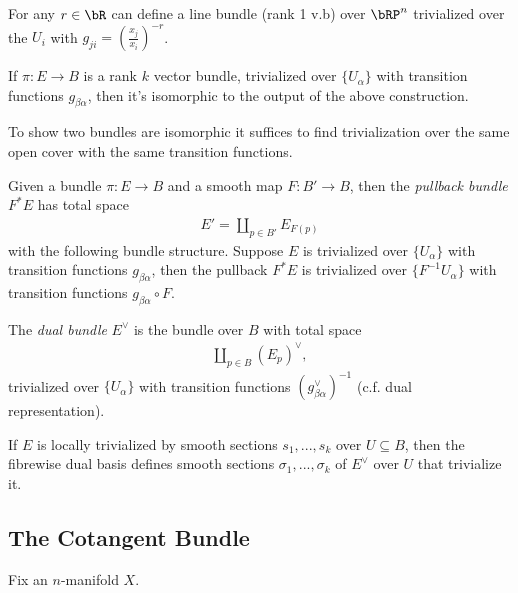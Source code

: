 \begin{example}\label{example:lec2.18}
	For any $r \in \bR$ can define a line bundle (rank 1 v.b) over $\bRP^n$ trivialized over the $U_i$ with $g_{ji} = \left(\frac{x_j}{x_i}\right)^{-r}$.
\end{example}
\begin{lem}\label{lem:lec2.19}
	If $\pi :E\to B$ is a rank $k$ vector bundle, trivialized over $\{U_\alpha\}$ with transition functions $g_{\beta\alpha}$, then it's isomorphic to the output of the above construction.
\end{lem}

\begin{cor}\label{cor:lec2.20}
	To show two bundles are isomorphic it suffices to find trivialization over the same open cover with the same transition functions.
\end{cor}

\begin{defn}\label{defn:pullback-bundle}
	Given a bundle $\pi:E\to B$ and a smooth map $F:B'\to B$, then the \emph{pullback bundle} $F^*E$ has total space
	\begin{align*}
		E' = \coprod_{p \in B'} E_{F(p)}
	\end{align*}
	with the following bundle structure. Suppose $E$ is trivialized over $\{U_\alpha\}$ with transition functions $g_{\beta\alpha}$, then the pullback $F^*E$ is trivialized over $\{F^{-1}U_\alpha\}$ with transition functions $g_{\beta\alpha} \circ F$.
\end{defn}

\begin{defn}\label{defn:}
	The \emph{dual bundle} $E^\vee$ is the bundle over $B$ with total space
	\begin{align*}
		\coprod_{p \in B} (E_p)^\vee,
	\end{align*}
	trivialized over $\{U_\alpha\}$ with transition functions $(g_{\beta\alpha}^\vee)^{-1}$ (c.f. dual representation).
\end{defn}
\begin{example}\label{example:lec2.23}
	If $E$ is locally trivialized by smooth sections $s_1,...,s_k$ over $U \subseteq B$, then the fibrewise dual basis defines smooth sections $\sigma_1, ...,\sigma_k$ of $E^\vee$ over $U$ that trivialize it.
\end{example}

\subsection{The Cotangent Bundle}
Fix an $n$-manifold $X$.

